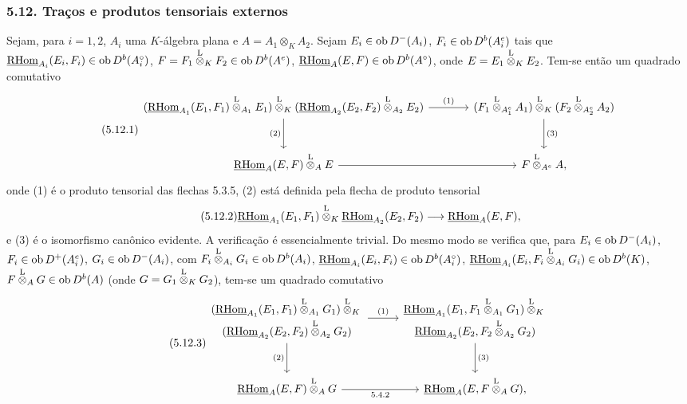 \subsubsection*{5.12. Traços e produtos tensoriais externos}

Sejam, para $i=1,2$, $A_i$ uma $K$-álgebra plana e $A=A_1\otimes_KA_2$. Sejam $E_i\in\operatorname{ob} D^-(A_i)$, $F_i\in\operatorname{ob} D^b(A_i^e)$ tais que $\underline{\mathrm{RHom}}_{A_i}(E_i,F_i)\in\operatorname{ob} D^b(A_i^\circ)$, $F=F_1\overset{\mathrm L}{\otimes}_KF_2\in\operatorname{ob} D^b(A^e)$, $\underline{\mathrm{RHom}}_A(E,F)\in\operatorname{ob} D^b(A^\circ)$, onde $E=E_1\overset{\mathrm L}{\otimes}_KE_2$. Tem-se então um quadrado comutativo
\begin{equation}\tag{5.12.1}
\begin{tikzcd}[column sep=large,row sep=large]
(\uRHom_{A_1}(E_1,F_1)\lten_{A_1}E_1)\lten_K(\uRHom_{A_2}(E_2,F_2)\lten_{A_2}E_2) \arrow[r,"(1)"] \arrow[d,"(2)"'] & (F_1\lten_{A_1^e}A_1)\lten_K(F_2\lten_{A_2^e}A_2) \arrow[d,"(3)"]\\
\uRHom_A(E,F)\lten_AE \arrow[r] & F\lten_{A^e}A,
\end{tikzcd}
\end{equation}
onde (1) é o produto tensorial das flechas 5.3.5, (2) está definida pela flecha de produto tensorial
\begin{equation}\tag{5.12.2}
\underline{\mathrm{RHom}}_{A_1}(E_1,F_1)\overset{\mathrm L}{\otimes}_K\underline{\mathrm{RHom}}_{A_2}(E_2,F_2)\longrightarrow\underline{\mathrm{RHom}}_A(E,F),
\end{equation}
e (3) é o isomorfismo canônico evidente. A verificação é essencialmente trivial. Do mesmo modo se verifica que, para $E_i\in\operatorname{ob} D^-(A_i)$, $F_i\in\operatorname{ob} D^+(A_i^e)$, $G_i\in\operatorname{ob} D^-(A_i)$, com $F_i\overset{\mathrm L}{\otimes}_{A_i}G_i\in\operatorname{ob} D^b(A_i)$, $\underline{\mathrm{RHom}}_{A_i}(E_i,F_i)\in\operatorname{ob} D^b(A_i^\circ)$, $\underline{\mathrm{RHom}}_{A_i}(E_i,F_i\overset{\mathrm L}{\otimes}_{A_i}G_i)\in\operatorname{ob} D^b(K)$, $F\overset{\mathrm L}{\otimes}_AG\in\operatorname{ob} D^b(A)$ (onde $G=G_1\overset{\mathrm L}{\otimes}_KG_2$), tem-se um quadrado comutativo
\begin{equation}\tag{5.12.3}
{\scriptstyle
\begin{tikzcd}[column sep=2.8em,row sep=large]
\begin{gathered}
(\uRHom_{A_1}(E_1,F_1)\lten_{A_1}G_1)\lten_K{}\\[-.15em]
(\uRHom_{A_2}(E_2,F_2)\lten_{A_2}G_2)
\end{gathered}
\arrow[r,"(1)"] \arrow[d,"(2)"']
&
\begin{gathered}
\uRHom_{A_1}(E_1,F_1\lten_{A_1}G_1)\lten_K{}\\[-.15em]
\uRHom_{A_2}(E_2,F_2\lten_{A_2}G_2)
\end{gathered}
\arrow[d,"(3)"]\\
\uRHom_A(E,F)\lten_AG \arrow[r,"5.4.2"'] & \uRHom_A(E,F\lten_AG),
\end{tikzcd}
}
\end{equation}

